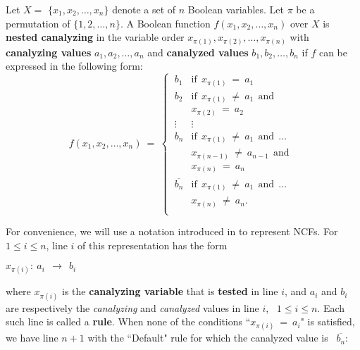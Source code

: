 \begin{definition}\label{def:nested_canalyzing}
Let $X = $ $\{x_1, x_2, \ldots, x_n\}$ denote a set of $n$  Boolean variables.
Let $\pi$ be a permutation of $\{1, 2, \ldots, n\}$.
A Boolean function $f(x_1, x_2, \ldots, x_n)$ over $X$ is \textbf{nested canalyzing}
in the variable order $x_{\pi(1)}, x_{\pi(2)}, \ldots, x_{\pi(n)}$ with
\textbf{canalyzing values} $a_1, a_2, \ldots, a_n$ and 
\textbf{canalyzed values} $b_1, b_2, \ldots, b_n$ 
if $f$ can be expressed in the following form:
\[
f(x_1, x_2, \ldots, x_n) ~=~ 
   \begin{cases}
       \:b_1 & \mathrm{if~~} x_{\pi(1)} ~=~ a_1 \\
       \:b_2 & \mathrm{if~~} x_{\pi(1)} ~\neq~ a_1 \mathrm{~~and~~}\\
             & x_{\pi(2)} ~=~ a_2 \\
       \:\vdots & \vdots \\ %
       \:b_n & \mathrm{if~~} x_{\pi(1)} ~\neq~ a_1 \mathrm{~~and~~} \ldots \\
             & x_{\pi(n-1)} ~\neq~ a_{n-1} \mathrm{~~and~~}\\
             & x_{\pi(n)} ~=~ a_n \\ %
       \:\overline{b_n} & \mathrm{if~~} x_{\pi(1)} ~\neq~ a_1 \mathrm{~~and~~} \ldots\\
                        & x_{\pi(n)} ~\neq~ a_n. \\
   \end{cases}
\]
\end{definition}
For convenience, we will use a notation introduced in \cite{Stearns-etal-2018}
to represent NCFs.
For $1 \leq i \leq n$, line $i$ of this representation has the form

\medskip

\noindent
\hspace*{0.5in} $x_{\pi(i)}:~ a_i ~~\longrightarrow~~ b_i$

\medskip

\noindent 
where $x_{\pi(i)}$ is the \textbf{canalyzing variable} that is
\textbf{tested} in line $i$, 
and $a_i$ and $b_i$ are respectively the \emph{canalyzing} and 
\emph{canalyzed} values in line $i$,~ $1 \leq i \leq n$.
Each such line is called a \textbf{rule}.
When none of the conditions ``$x_{\pi(i)} ~=~ a_i$" 
is satisfied, we have line $n+1$ with the ``Default" rule
for which the canalyzed value is~ $\overline{b_n}$: 

\medskip

